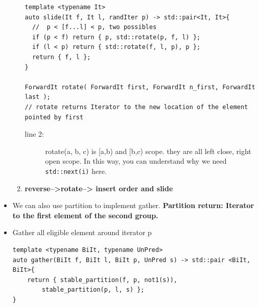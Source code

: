 \documentclass[a4paper,11pt,twoside]{book}
\begin{document}
\begin{itemize}
\begin{enumerate}
\begin{lstlisting}[breaklines, basicstyle=\scriptsize]
template <typename It> 
auto slide(It f, It l, randIter p) -> std::pair<It, It>{
  //  p < [f...l] < p, two possibles 
  if (p < f) return { p, std::rotate(p, f, l) };
  if (l < p) return { std::rotate(f, l, p), p };
  return { f, l };
}

ForwardIt rotate( ForwardIt first, ForwardIt n_first, ForwardIt last );
// rotate returns Iterator to the new location of the element pointed by first
\end{lstlisting}
\begin{description}
	\item[line 2:] rotate(a, b, c) is [a,b) and [b,c) scope. they are all left close, right open scope. In this way, you can understand why we need \texttt{std::next(i)} here.
\end{description}

	\item \textbf{reverse-->rotate--> insert order and slide}

\end{enumerate}

	\item We can also use partition to implement gather. \textbf{Partition return: Iterator to the first element of the second group.}

	\item Gather all eligible element around iterator p
\begin{lstlisting}[numbers=none]
template <typename BiIt, typename UnPred> 
auto gather(BiIt f, BiIt l, BiIt p, UnPred s) -> std::pair <BiIt, BiIt>{
	return { stable_partition(f, p, not1(s)), 
		stable_partition(p, l, s) };
}		
\end{lstlisting}



\end{itemize}
\end{document}
